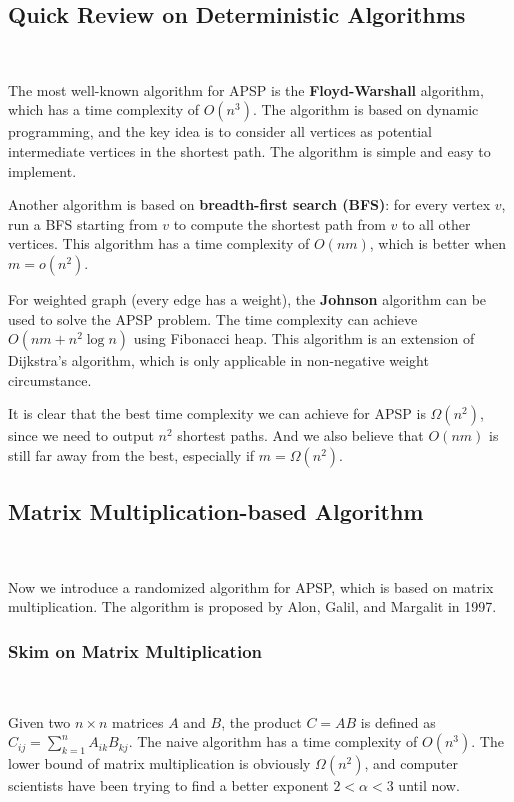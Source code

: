 \documentclass[11pt]{article}
\theoremstyle{plain}
\begin{document}
\subsection{Quick Review on Deterministic Algorithms}\

The most well-known algorithm for APSP is the \textbf{Floyd-Warshall} algorithm, which has a time complexity of $O(n^3)$. The algorithm is based on dynamic programming, and the key idea is to consider all vertices as potential intermediate vertices in the shortest path. The algorithm is simple and easy to implement.

Another algorithm is based on \textbf{breadth-first search (BFS)}: for every vertex $v$, run a BFS starting from $v$ to compute the shortest path from $v$ to all other vertices. This algorithm has a time complexity of $O(nm)$, which is better when $m=o(n^2)$.

For weighted graph (every edge has a weight), the \textbf{Johnson} algorithm can be used to solve the APSP problem. The time complexity can achieve $O(nm+n^2\log n)$ using Fibonacci heap. This algorithm is an extension of Dijkstra's algorithm, which is only applicable in non-negative weight circumstance. 

It is clear that the best time complexity we can achieve for APSP is $\Omega(n^2)$, since we need to output $n^2$ shortest paths. And we also believe that $O(nm)$ is still far away from the best, especially if $m=\Omega(n^2)$.

\subsection{Matrix Multiplication-based Algorithm}\

Now we introduce a randomized algorithm for APSP, which is based on matrix multiplication. The algorithm is proposed by Alon, Galil, and Margalit in 1997\cite{alon1997exponent}.

\subsubsection{Skim on Matrix Multiplication}\

Given two $n\times n$ matrices $A$ and $B$, the product $C=AB$ is defined as $C_{ij}=\sum_{k=1}^n A_{ik}B_{kj}$. The naive algorithm has a time complexity of $O(n^3)$. The lower bound of matrix multiplication is obviously $\Omega(n^2)$, and computer scientists have been trying to find a better exponent $2<\alpha<3$ until now.
\end{document}
